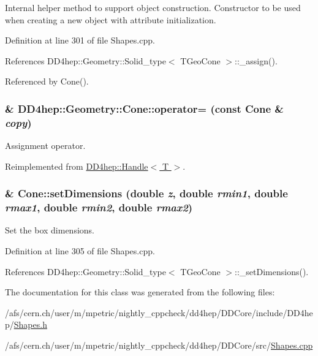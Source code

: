 Internal helper method to support object construction. Constructor to be used when creating a new object with attribute initialization. 

Definition at line 301 of file Shapes.cpp.

References DD4hep::Geometry::Solid\_\-type$<$ TGeoCone $>$::\_\-assign().

Referenced by Cone().\hypertarget{class_d_d4hep_1_1_geometry_1_1_cone_af1c438fd229ac53ca1f0c555b8f76e1f}{
\subsubsection[{operator=}]{\& DD4hep::Geometry::Cone::operator= (const {\bf Cone} \& {\em copy})}}
\label{class_d_d4hep_1_1_geometry_1_1_cone_af1c438fd229ac53ca1f0c555b8f76e1f}


Assignment operator. 

Reimplemented from \hyperlink{class_d_d4hep_1_1_handle_a9bbf8f498df42e81ad26fb00233505a6}{DD4hep::Handle$<$ T $>$}.\hypertarget{class_d_d4hep_1_1_geometry_1_1_cone_a946a244f8072fba8aab8d71379bafa46}{
\subsubsection[{setDimensions}]{ \& Cone::setDimensions (double {\em z}, \/  double {\em rmin1}, \/  double {\em rmax1}, \/  double {\em rmin2}, \/  double {\em rmax2})}}
\label{class_d_d4hep_1_1_geometry_1_1_cone_a946a244f8072fba8aab8d71379bafa46}


Set the box dimensions. 

Definition at line 305 of file Shapes.cpp.

References DD4hep::Geometry::Solid\_\-type$<$ TGeoCone $>$::\_\-setDimensions().

The documentation for this class was generated from the following files:\begin{DoxyCompactItemize}
\item 
/afs/cern.ch/user/m/mpetric/nightly\_\-cppcheck/dd4hep/DDCore/include/DD4hep/\hyperlink{_shapes_8h}{Shapes.h}\item 
/afs/cern.ch/user/m/mpetric/nightly\_\-cppcheck/dd4hep/DDCore/src/\hyperlink{_shapes_8cpp}{Shapes.cpp}\end{DoxyCompactItemize}
